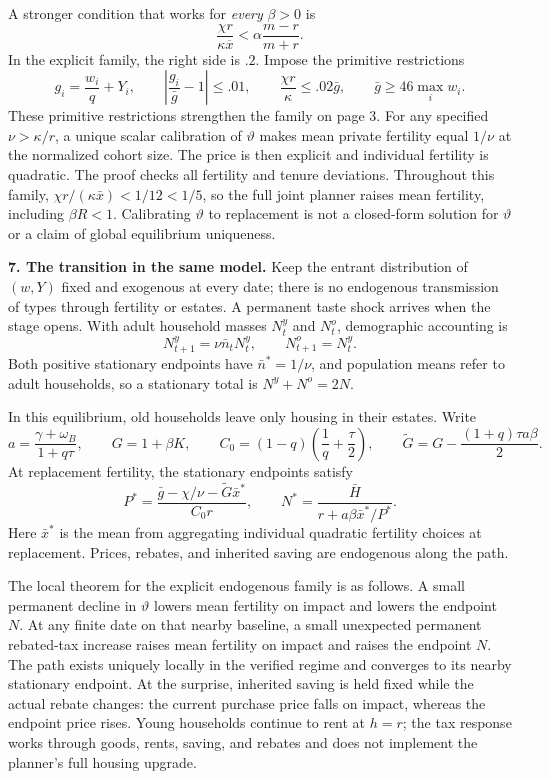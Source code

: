 \documentclass[11pt]{article}
\newcommand{\avg}[1]{\overline{#1}}
\begin{document}
A stronger condition that works for \emph{every} $\beta>0$ is
\[
\frac{\chi r}{\kappa\avg x}<\alpha\frac{m-r}{m+r}.
\]
In the explicit family, the right side is $.2$. Impose the primitive restrictions
\[
g_i=\frac{w_i}{q}+Y_i,\qquad
\left|\frac{g_i}{\bar g}-1\right|\le .01,\qquad
\frac{\chi r}{\kappa}\le .02\bar g,\qquad
\bar g\ge46\max_i w_i.
\]
These primitive restrictions strengthen the family on page 3. For any specified
$\nu>\kappa/r$, a unique scalar calibration of $\vartheta$ makes mean private
fertility equal $1/\nu$ at the normalized cohort size. The price is then explicit
and individual fertility is quadratic. The proof checks all fertility and tenure
deviations. Throughout this family, $\chi r/(\kappa\bar x)<1/12<1/5$, so the
full joint planner raises mean fertility, including $\beta R<1$. Calibrating
$\vartheta$ to replacement is not a closed-form solution for $\vartheta$ or a
claim of global equilibrium uniqueness.

\newpage
\textbf{7. The transition in the same model.}
Keep the entrant distribution of $(w,Y)$ fixed and exogenous at every date;
there is no endogenous transmission of types through fertility or estates. A
permanent taste shock arrives when the stage opens. With adult household masses
$N_t^y$ and $N_t^o$, demographic accounting is
\[
N^y_{t+1}=\nu\bar n_tN^y_t,
\qquad N^o_{t+1}=N^y_t.
\]
Both positive stationary endpoints have $\bar n^*=1/\nu$, and population means
refer to adult households, so a stationary total is $N^y+N^o=2N$.

In this equilibrium, old households leave only housing in their estates. Write
\[
a=\frac{\gamma+\omega_B}{1+q\tau},\qquad
G=1+\beta K,\qquad
C_0=(1-q)\left(\frac1q+\frac\tau2\right),\qquad
\widetilde G=G-\frac{(1+q)\tau a\beta}{2}.
\]
At replacement fertility, the stationary endpoints satisfy
\[
P^*=\frac{\bar g-\chi/\nu-\widetilde G\bar x^*}{C_0r},
\qquad
N^*=\frac{\bar H}{r+a\beta\bar x^*/P^*}.
\]
Here $\bar x^*$ is the mean from aggregating individual quadratic fertility
choices at replacement. Prices, rebates, and inherited saving are endogenous
along the path.

The local theorem for the explicit endogenous family is as follows. A small
permanent decline in $\vartheta$ lowers mean fertility on impact and lowers the
endpoint $N$. At any finite date on that nearby baseline, a small unexpected
permanent rebated-tax increase raises mean fertility on impact and raises the
endpoint $N$. The path exists uniquely locally in the verified regime and
converges to its nearby stationary endpoint. At the surprise, inherited saving
is held fixed while the actual rebate changes: the current purchase price falls
on impact, whereas the endpoint price rises. Young households continue to rent
at $h=r$; the tax response works through goods, rents, saving, and rebates and
does not implement the planner's full housing upgrade.
\end{document}
